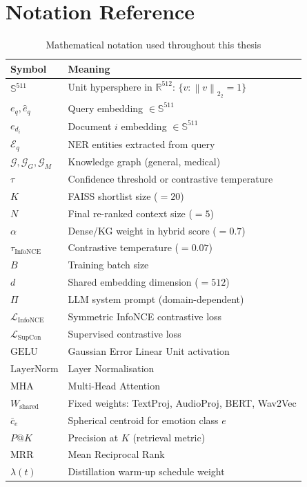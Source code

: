\documentclass[12pt,a4paper]{article}
\theoremstyle{definition}
\theoremstyle{plain}
\theoremstyle{remark}
\newcommand{\R}{\mathbb{R}}
\newcommand{\Sph}{\mathbb{S}}
\newcommand{\Norm}[1]{\left\|#1\right\|_2}
\newcommand{\Loss}{\mathcal{L}}
\newcommand{\KG}{\mathcal{G}}
\newcommand{\LN}{\mathrm{LayerNorm}}
\newcommand{\GELU}{\mathrm{GELU}}
\newcommand{\MHA}{\mathrm{MHA}}
\begin{document}
\section{Notation Reference}

\begin{table}[H]
\centering
\caption{Mathematical notation used throughout this thesis}
\begin{tabular}{ll}
\toprule
\textbf{Symbol} & \textbf{Meaning} \\
\midrule
$\Sph^{511}$ & Unit hypersphere in $\R^{512}$: $\{v : \Norm{v}_2 = 1\}$ \\
$e_q, \hat{e}_q$ & Query embedding $\in \Sph^{511}$ \\
$e_{d_i}$ & Document $i$ embedding $\in \Sph^{511}$ \\
$\mathcal{E}_q$ & NER entities extracted from query \\
$\KG, \KG_G, \KG_M$ & Knowledge graph (general, medical) \\
$\tau$ & Confidence threshold or contrastive temperature \\
$K$ & FAISS shortlist size ($= 20$) \\
$N$ & Final re-ranked context size ($= 5$) \\
$\alpha$ & Dense/KG weight in hybrid score ($= 0.7$) \\
$\tau_{\text{InfoNCE}}$ & Contrastive temperature ($= 0.07$) \\
$B$ & Training batch size \\
$d$ & Shared embedding dimension ($= 512$) \\
$\Pi$ & LLM system prompt (domain-dependent) \\
$\Loss_{\text{InfoNCE}}$ & Symmetric InfoNCE contrastive loss \\
$\Loss_{\text{SupCon}}$ & Supervised contrastive loss \\
$\GELU$ & Gaussian Error Linear Unit activation \\
$\LN$ & Layer Normalisation \\
$\MHA$ & Multi-Head Attention \\
$W_{\text{shared}}$ & Fixed weights: TextProj, AudioProj, BERT, Wav2Vec \\
$\bar{c}_e$ & Spherical centroid for emotion class $e$ \\
$P@K$ & Precision at $K$ (retrieval metric) \\
$\text{MRR}$ & Mean Reciprocal Rank \\
$\lambda(t)$ & Distillation warm-up schedule weight \\
\bottomrule
\end{tabular}
\end{table}
\end{document}
